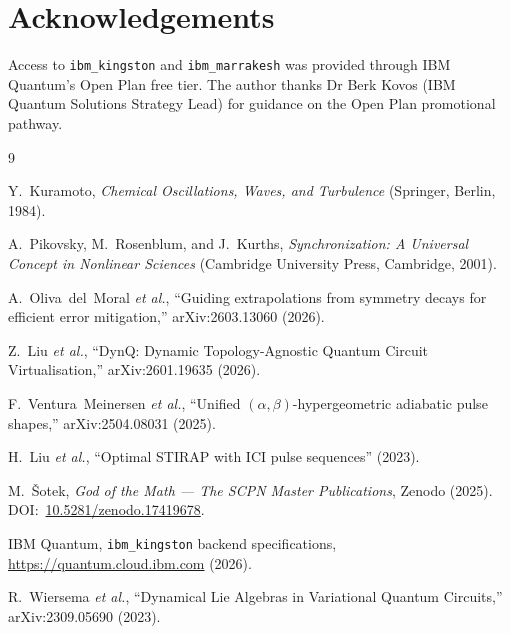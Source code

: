 \documentclass[reprint,aps,physrev,superscriptaddress,floatfix,longbibliography]{revtex4-2}
\begin{document}
\section*{Acknowledgements}

Access to \texttt{ibm\_kingston} and \texttt{ibm\_marrakesh} was
provided through IBM Quantum's Open Plan free tier. The author thanks
Dr Berk Kovos (IBM Quantum Solutions Strategy Lead) for guidance on
the Open Plan promotional pathway.



\begin{thebibliography}{9}

Y.~Kuramoto,
\emph{Chemical Oscillations, Waves, and Turbulence}
(Springer, Berlin, 1984).

A.~Pikovsky, M.~Rosenblum, and J.~Kurths,
\emph{Synchronization: A Universal Concept in Nonlinear Sciences}
(Cambridge University Press, Cambridge, 2001).

A.~Oliva~del~Moral \emph{et al.},
``Guiding extrapolations from symmetry decays for efficient error
mitigation,''
arXiv:2603.13060 (2026).

Z.~Liu \emph{et al.},
``DynQ: Dynamic Topology-Agnostic Quantum Circuit Virtualisation,''
arXiv:2601.19635 (2026).

F.~Ventura~Meinersen \emph{et al.},
``Unified $(\alpha,\beta)$-hypergeometric adiabatic pulse shapes,''
arXiv:2504.08031 (2025).

H.~Liu \emph{et al.},
``Optimal STIRAP with ICI pulse sequences'' (2023).

M.~\v{S}otek,
\emph{God of the Math --- The SCPN Master Publications},
Zenodo (2025).
DOI:~\href{https://doi.org/10.5281/zenodo.17419678}{10.5281/zenodo.17419678}.

IBM Quantum,
\texttt{ibm\_kingston} backend specifications,
\url{https://quantum.cloud.ibm.com} (2026).

R.~Wiersema \emph{et al.},
``Dynamical Lie Algebras in Variational Quantum Circuits,''
arXiv:2309.05690 (2023).

\end{thebibliography}
\end{document}
